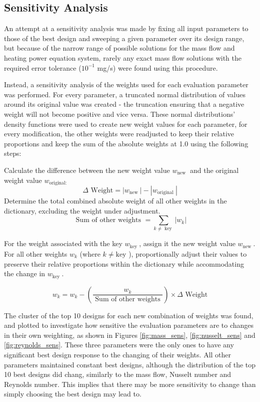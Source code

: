 \documentclass{homework}
\begin{document}
\begin{multicols}{2}
\subsection{Sensitivity Analysis}

An attempt at a sensitivity analysis was made by fixing all input parameters to those of the best design and sweeping a given parameter over its design range, but because of the narrow range of possible solutions for the mass flow and heating power equation system, rarely any exact mass flow solutions with the required error tolerance ($10^{-1}$ mg/s) were found using this procedure. 

Instead, a sensitivity analysis of the weights used for each evaluation parameter was performed. For every parameter, a truncated normal distribution of values around its original value was created - the truncation ensuring that a negative weight will not become positive and vice versa. These normal distributions' density functions were used to create new weight values for each parameter, for every modification, the other weights were readjusted to keep their relative proportions and keep the sum of the absolute weights at 1.0 using the following steps:

Calculate the difference between the new weight value \(w_{\text {new }}\) and the original weight value \(w_{\text {original: }}\)
$$
\Delta \text{ Weight}=\left|w_{\text {new }}\right|-\left|w_{\text {original }}\right|
$$
Determine the total combined absolute weight of all other weights in the dictionary, excluding the weight under adjustment.
$$
\text { Sum of other weights }=\sum_{k \neq \text { key }}\left|w_k\right|
$$

For the weight associated with the key \(w_{\text {key }}\), assign it the new weight value \(w_{\text {new }}\).
For all other weights \(w_k\) (where \(k \neq \mathrm{key}\) ), proportionally adjust their values to preserve their relative proportions within the dictionary while accommodating the change in \(w_{\text {key }}\).

$$
w_k=w_k-\left(\frac{w_k}{\text { Sum of other weights }}\right) \times \Delta \text{ Weight}
$$

The cluster of the top 10 designs for each new combination of weights was found, and plotted to investigate how sensitive the evaluation parameters are to changes in their own weighting, as shown in Figures \ref{fig:mass_sens}, \ref{fig:nusselt_sens} and \ref{fig:reynolds_sens}. These three parameters were the only ones to have any significant best design response to the changing of their weights. All other parameters maintained constant best designs, although the distribution of the top 10 best designs did chang, similarly to the mass flow, Nusselt number and Reynolds number. This implies that there may be more sensitivity to change than simply choosing the best design may lead to.


\end{multicols}
\end{document}

